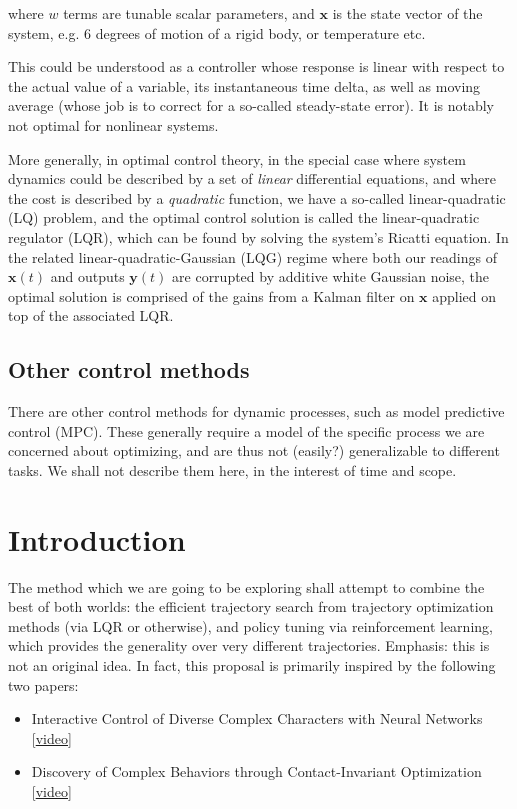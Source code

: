 \documentclass{article}
\newcommand{\bvec}[1]{\boldsymbol{#1}}
\begin{document}
where $w$ terms are tunable scalar parameters, and $\bvec{x}$ is the state vector of the system, e.g. 6 degrees of motion of a rigid body, or temperature etc.

This could be understood as a controller whose response is linear with respect to the actual value of a variable, its instantaneous time delta, as well as moving average (whose job is to correct for a so-called steady-state error). It is notably not optimal for nonlinear systems.

More generally, in optimal control theory, in the special case where system dynamics could be described by a set of \textit{linear} differential equations, and where the cost is described by a \textit{quadratic} function, we have a so-called linear-quadratic (LQ) problem, and the optimal control solution is called the linear-quadratic regulator (LQR), which can be found by solving the system's Ricatti equation. In the related linear-quadratic-Gaussian (LQG) regime where both our readings of $\bvec{x}(t)$ and outputs $\bvec{y}(t)$ are corrupted by additive white Gaussian noise, the optimal solution is comprised of the gains from a Kalman filter on $\bvec{x}$ applied on top of the associated LQR.

\subsection{Other control methods}
There are other control methods for dynamic processes, such as model predictive control (MPC). These generally require a model of the specific process we are concerned about optimizing, and are thus not (easily?) generalizable to different tasks. We shall not describe them here, in the interest of time and scope.

\section{Introduction}
The method which we are going to be exploring shall attempt to combine the best of both worlds: the efficient trajectory search from trajectory optimization methods (via LQR or otherwise), and policy tuning via reinforcement learning, which provides the generality over very different trajectories. Emphasis: this is not an original idea. In fact, this proposal is primarily inspired by the following two papers:

\begin{itemize}
	\item Interactive Control of Diverse Complex Characters with Neural Networks \cite{mordatch2015interactive} [\href{https://www.youtube.com/watch?v=57D-qgVX-6o}{video}]
	\item Discovery of Complex Behaviors through Contact-Invariant Optimization \cite{mordatch2012discovery} [\href{https://www.youtube.com/watch?v=mhr_jtQrhVA}{video}]
\end{itemize}
\end{document}
